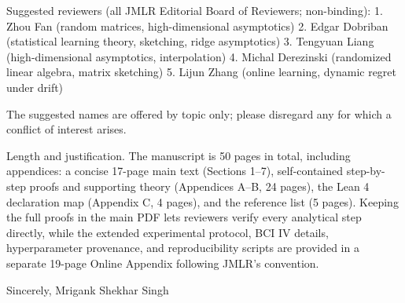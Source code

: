 \documentclass[11pt]{article}
\begin{document}
Suggested reviewers (all JMLR Editorial Board of Reviewers; non-binding):
  1. Zhou Fan (random matrices, high-dimensional asymptotics)
  2. Edgar Dobriban (statistical learning theory, sketching, ridge asymptotics)
  3. Tengyuan Liang (high-dimensional asymptotics, interpolation)
  4. Michal Derezinski (randomized linear algebra, matrix sketching)
  5. Lijun Zhang (online learning, dynamic regret under drift)

The suggested names are offered by topic only; please disregard any for which a
conflict of interest arises.

Length and justification. The manuscript is 50 pages in total, including
appendices: a concise 17-page main text (Sections 1--7), self-contained
step-by-step proofs and supporting theory (Appendices A--B, 24 pages), the Lean 4
declaration map (Appendix C, 4 pages), and the reference list (5 pages). Keeping
the full proofs in the main PDF lets reviewers verify every analytical step
directly, while the extended experimental protocol, BCI IV details, hyperparameter
provenance, and reproducibility scripts are provided in a separate 19-page Online
Appendix following JMLR's convention.

Sincerely,
Mrigank Shekhar Singh
\end{document}
